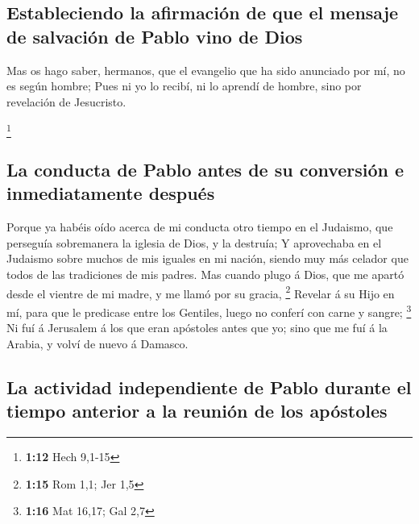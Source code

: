 \hypertarget{estableciendo-la-afirmaciuxf3n-de-que-el-mensaje-de-salvaciuxf3n-de-pablo-vino-de-dios}{%
\subsection{Estableciendo la afirmación de que el mensaje de salvación
de Pablo vino de
Dios}\label{estableciendo-la-afirmaciuxf3n-de-que-el-mensaje-de-salvaciuxf3n-de-pablo-vino-de-dios}}

 Mas os hago saber, hermanos, que el evangelio que ha
sido anunciado por mí, no es según hombre;  Pues ni yo lo
recibí, ni lo aprendí de hombre, sino por revelación de Jesucristo.

\footnote{\textbf{1:12} Hech 9,1-15}

\hypertarget{la-conducta-de-pablo-antes-de-su-conversiuxf3n-e-inmediatamente-despuuxe9s}{%
\subsection{La conducta de Pablo antes de su conversión e inmediatamente
después}\label{la-conducta-de-pablo-antes-de-su-conversiuxf3n-e-inmediatamente-despuuxe9s}}

 Porque ya habéis oído acerca de mi conducta otro tiempo
en el Judaismo, que perseguía sobremanera la iglesia de Dios, y la
destruía;  Y aprovechaba en el Judaismo sobre muchos de
mis iguales en mi nación, siendo muy más celador que todos de las
tradiciones de mis padres.  Mas cuando plugo á Dios, que
me apartó desde el vientre de mi madre, y me llamó por su gracia,
\footnote{\textbf{1:15} Rom 1,1; Jer 1,5}  Revelar á su
Hijo en mí, para que le predicase entre los Gentiles, luego no conferí
con carne y sangre; \footnote{\textbf{1:16} Mat 16,17; Gal 2,7}
 Ni fuí á Jerusalem á los que eran apóstoles antes que
yo; sino que me fuí á la Arabia, y volví de nuevo á Damasco.

\hypertarget{la-actividad-independiente-de-pablo-durante-el-tiempo-anterior-a-la-reuniuxf3n-de-los-apuxf3stoles}{%
\subsection{La actividad independiente de Pablo durante el tiempo
anterior a la reunión de los
apóstoles}\label{la-actividad-independiente-de-pablo-durante-el-tiempo-anterior-a-la-reuniuxf3n-de-los-apuxf3stoles}}

